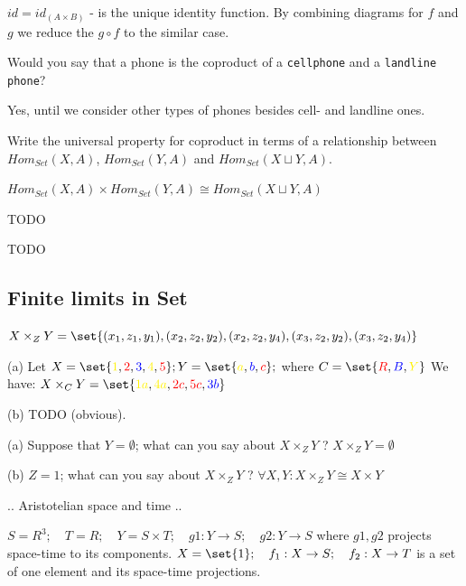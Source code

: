 \documentclass{article}
\begin{document}
$id = id_{(A \times B)}$ - is the unique identity function. By combining diagrams for $f$ and $g$ we
reduce the $g \circ f$ to the similar case.


Would you say that a phone is the coproduct of a \texttt{cellphone} and a \texttt{landline phone}?

\ans
Yes, until we consider other types of phones besides cell- and landline ones.


Write the universal property for coproduct in terms of a relationship between
$Hom_{Set}(X,A)$, $Hom_{Set}(Y,A)$ and $Hom_{Set}(X \sqcup Y, A)$.

\ans

$Hom_{Set}(X,A) \times Hom_{Set}(Y,A) \cong Hom_{Set}(X \sqcup Y, A)$


TODO


TODO


\subsection{Finite limits in Set}


\ans $X \times_{Z} Y = \set{(x_1,z_1,y_1), (x_2,z_2,y_2), (x_2,z_2,y_4), (x_3,z_2,y_2),
(x_3,z_2,y_4)}$



(a)
\ans Let $X = \set{\Y{1},\R{2},\B{3},\Y{4},\R{5}}; Y = \set{\Y{a},\B{b},\R{c}};$ where
$C = \set{\R{R},\B{B},\Y{Y}}$ \vsp We have:
$X \times_C Y = \set{\Y{1a},\Y{4a},\R{2c},\R{5c},\B{3b}}$

(b)
TODO (obvious).


(a) Suppose that $Y = \emptyset$; what can you say about $X \times_Z Y$ ?
\ans $X \times_Z Y = \emptyset$ \vsp

(b) $Z = {1}$; what can you say about $X \times_Z Y$ ?
\ans $\forall X,Y : X \times_Z Y \cong X \times Y$


.. Aristotelian space and time ..

$S = R^3;\quad T = R;\quad Y = S \times T;\quad g1 : Y \to S ;\quad g2 : Y \to S$ where $g1,g2$
projects space-time to its components. $X = \set{1};\quad f_1 : X \to S;\quad f_2 : X \to T$ is a
set of one element and its space-time projections.
\end{document}
